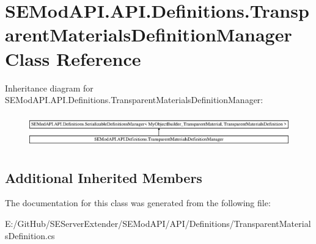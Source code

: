\hypertarget{class_s_e_mod_a_p_i_1_1_a_p_i_1_1_definitions_1_1_transparent_materials_definition_manager}{}\section{S\+E\+Mod\+A\+P\+I.\+A\+P\+I.\+Definitions.\+Transparent\+Materials\+Definition\+Manager Class Reference}
\label{class_s_e_mod_a_p_i_1_1_a_p_i_1_1_definitions_1_1_transparent_materials_definition_manager}
Inheritance diagram for S\+E\+Mod\+A\+P\+I.\+A\+P\+I.\+Definitions.\+Transparent\+Materials\+Definition\+Manager\+:\begin{figure}[H]
\begin{center}
\leavevmode
\includegraphics[height=1.454545cm]{class_s_e_mod_a_p_i_1_1_a_p_i_1_1_definitions_1_1_transparent_materials_definition_manager}
\end{center}
\end{figure}
\subsection*{Additional Inherited Members}


The documentation for this class was generated from the following file\+:\begin{DoxyCompactItemize}
\item 
E\+:/\+Git\+Hub/\+S\+E\+Server\+Extender/\+S\+E\+Mod\+A\+P\+I/\+A\+P\+I/\+Definitions/Transparent\+Materials\+Definition.\+cs\end{DoxyCompactItemize}
